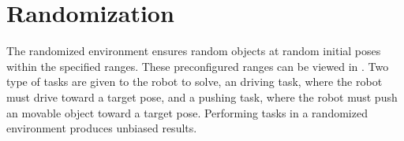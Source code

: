 %
%
%
%

\section{Randomization}%
\label{sec:randomisation}
The randomized environment ensures random objects at random initial poses within the specified ranges. These preconfigured ranges can be viewed in . Two type of tasks are given to the robot to solve, an driving task, where the robot must drive toward a target pose, and a pushing task, where the robot must push an movable object toward a target pose. Performing tasks in a randomized environment produces unbiased results.\bs

